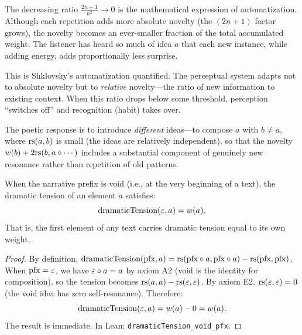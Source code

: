 \begin{interpretation}
\label{interp:diminishing-returns}
The decreasing ratio $\frac{2n+1}{n^2} \to 0$ is the mathematical expression
of automatization.  Although each repetition adds more absolute novelty (the
$(2n+1)$ factor grows), the novelty becomes an ever-smaller fraction of the
total accumulated weight.  The listener has heard so much of idea $a$ that each
new instance, while adding energy, adds proportionally less surprise.

This is Shklovsky's automatization quantified.  The perceptual system
adapts not to absolute novelty but to \emph{relative} novelty---the ratio of
new information to existing context.  When this ratio drops below some
threshold, perception ``switches off'' and recognition (habit) takes over.

The poetic response is to introduce \emph{different} ideas---to compose $a$
with $b \neq a$, where $\mathrm{rs}(a, b)$ is small (the ideas are relatively
independent), so that the novelty $w(b) + 2\mathrm{rs}(b, a \circ \cdots)$
includes a substantial component of genuinely new resonance rather than
repetition of old patterns.
\end{interpretation}


\begin{theorem}
\label{thm:tension-void-pfx}
When the narrative prefix is void (i.e., at the very beginning of a text), the dramatic tension of an element $a$ satisfies:
\[
  \text{dramaticTension}(\varepsilon, a) = w(a).
\]
That is, the first element of any text carries dramatic tension equal to its own weight.
\end{theorem}

\begin{proof}
By definition, $\text{dramaticTension}(\text{pfx}, a) = \mathrm{rs}(\text{pfx} \circ a, \text{pfx} \circ a) - \mathrm{rs}(\text{pfx}, \text{pfx})$.  When $\text{pfx} = \varepsilon$, we have $\varepsilon \circ a = a$ by axiom A2 (void is the identity for composition), so the tension becomes $\mathrm{rs}(a, a) - \mathrm{rs}(\varepsilon, \varepsilon)$.  By axiom E2, $\mathrm{rs}(\varepsilon, \varepsilon) = 0$ (the void idea has zero self-resonance).  Therefore:
\[
  \text{dramaticTension}(\varepsilon, a) = w(a) - 0 = w(a).
\]
The result is immediate.  In Lean: \texttt{dramaticTension\_void\_pfx}.
\end{proof}

